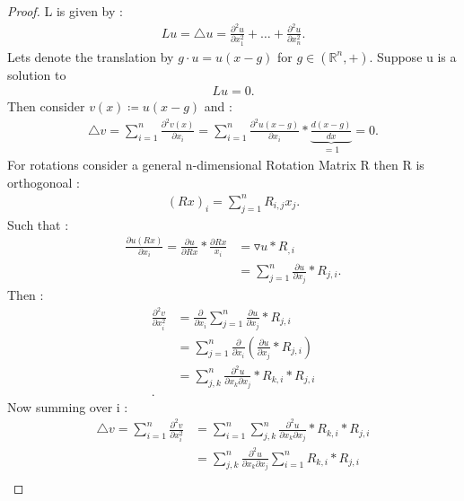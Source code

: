 \begin{proof}[Proof]
  L is given by : 
  \begin{align*}
    L u = \triangle u  = \frac{\partial ^2 u}{\partial x_1^2} + \ldots + \frac{\partial ^2 u}{\partial x_n^2}
  .\end{align*}
  Lets denote the translation by $g \cdot u = u(x-g)$ for $g \in  (\mathbb{R}^{n},+) $.
  Suppose u is a solution to 
  \begin{align*}
    L u = 0
  .\end{align*}
  Then consider $v(x) \coloneqq  u(x - g) $ and : 
  \begin{align*}
    \triangle v =  \sum_{i=1}^{n} \frac{\partial^2 v(x)}{\partial x_i}   =  \sum_{i=1}^{n} \frac{\partial^2 u(x-g)}{\partial x_i} * \underbrace{\frac{d(x-g)}{dx}}_{=1} = 0
  .\end{align*}
  For rotations consider a general n-dimensional Rotation Matrix R then R is orthogonoal : 
  \begin{align*}
    (Rx)_i  = \sum_{j=1}^{n }R_{i,j}x_j  
  .\end{align*}
  Such that : 
  \begin{align*}
    \frac{\partial u(Rx)}{\partial x_i} = \frac{\partial u  }{\partial Rx} * \frac{\partial Rx}{x_i} &= \triangledown u * R_{,i}\\
                                                                                                     &= \sum_{j=1}^{n} \frac{\partial u}{\partial x_j} * R_{j,i}  
  .\end{align*}
  Then : 
  \begin{align*}
    \frac{\partial ^2 v}{\partial x_i ^2} &= \frac{\partial }{\partial x_i}   \sum_{j=1}^{n} \frac{\partial u}{\partial x_j} * R_{j,i}  \\
                                          &=  \sum_{j=1}^{n} \frac{\partial }{\partial x_i} (\frac{\partial u}{\partial x_j} * R_{j,i})  \\
                                          &= \sum_{j,k}^{n} \frac{\partial ^2 u}{\partial x_k \partial x_j} * R_{k,i}*R_{j,i} \\
  .\end{align*}
  Now summing over i : 
  \begin{align*}
    \triangle v = \sum_{i=1}^{n} \frac{\partial^2 v}{\partial x_{i}^2} &=  \sum_{i=1}^{n}  \sum_{j,k}^{n} \frac{\partial ^2 u}{\partial x_k \partial x_j} * R_{k,i}*R_{j,i} \\
                                                                       &=   \sum_{j,k}^{n}\frac{\partial ^2 u}{\partial x_k \partial x_j} \sum_{i=1}^{n} R_{k,i}*R_{j,i}\\

\end{align*}
\end{proof}
